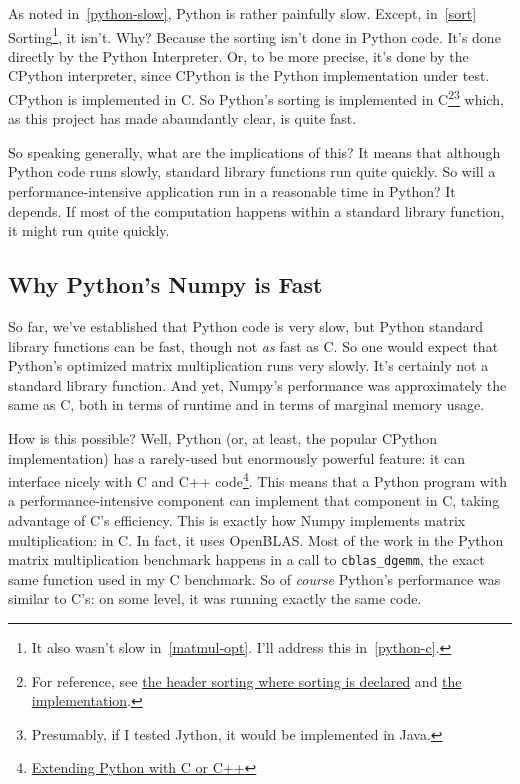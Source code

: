 \documentclass[12pt,letterpaper]{article}
\begin{document}
As noted in~\ref{python-slow}, Python is rather painfully slow. Except,
in~\ref{sort} Sorting\footnote{It also wasn't slow in~\ref{matmul-opt}. I'll
address this in~\ref{python-c}.}, it isn't. Why? Because the sorting isn't done
in Python code. It's done directly by the Python Interpreter. Or, to be more
precise, it's done by the CPython interpreter, since CPython is the Python
implementation under test. CPython is implemented in C. So Python's sorting is
implemented in C\footnote{For reference, see
\href{https://github.com/python/cpython/blob/f348154c8f8a9c254503306c59d6779d4d09b3a9/Include/listobject.h#L39}{the
header sorting where sorting is declared} and
\href{https://github.com/python/cpython/blob/f348154c8f8a9c254503306c59d6779d4d09b3a9/Objects/listobject.c#L2567-L2579}{the
implementation}.}\footnote{Presumably, if I tested Jython, it would be
implemented in Java.} which, as this project has made abaundantly clear, is
quite fast.

So speaking generally, what are the implications of this? It means that
although Python code runs slowly, standard library functions run quite quickly.
So will a performance-intensive application run in a reasonable time in Python?
It depends. If most of the computation happens within a standard library
function, it might run quite quickly.

\subsection{Why Python's Numpy is Fast}

So far, we've established that Python code is very slow, but Python standard
library functions can be fast, though not \emph{as} fast as C. So one would
expect that Python's optimized matrix multiplication runs very slowly. It's
certainly not a standard library function. And yet, Numpy's performance was
approximately the same as C, both in terms of runtime and in terms of marginal
memory usage.

How is this possible? Well, Python (or, at least, the popular CPython
implementation) has a rarely-used but enormously powerful feature: it can
interface nicely with C and C++
code\footnote{\href{https://docs.python.org/3/extending/extending.html}{Extending
Python with C or C++}}. This means that a Python program with a
performance-intensive component can implement that component in C, taking
advantage of C's efficiency. This is exactly how Numpy implements matrix
multiplication: in C. In fact, it uses OpenBLAS. Most of the work in the Python
matrix multiplication benchmark happens in a call to \texttt{cblas\_dgemm}, the
exact same function used in my C benchmark. So of \emph{course} Python's
performance was similar to C's: on some level, it was running exactly the same
code.
\end{document}
